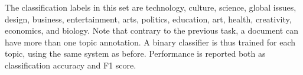The classification labels in this set are technology, culture, science, global issues, design, business, entertainment, arts, politics, education, art, health, creativity, economics, and biology. Note that contrary to the previous task, a document can have more than one topic annotation. A binary classifier is thus trained for each topic, using the same system as before. Performance is reported both as classification accuracy and F1 score.








